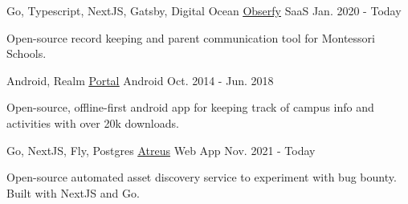 

\begin{cventries}

  \cventry
  {Go, Typescript, NextJS, Gatsby, Digital Ocean} %
  {\underline{\href{https://github.com/obserfy/obserfy}{Obserfy}}} %
  {SaaS} %
  {Jan. 2020 - Today} %
  {
    \begin{cvitems} %
      \item {Open-source record keeping and parent communication tool for Montessori Schools.}
    \end{cvitems}
  }

  \cventry
  {Android, Realm} %
  {\underline{\href{https://github.com/chrsep/Kingfish}{Portal}}} %
  {Android} %
  {Oct. 2014 - Jun. 2018} %
  {
    \begin{cvitems} %
      \item {Open-source, offline-first android app for keeping track of campus info and activities with over 20k downloads.}
    \end{cvitems}
  }


  \cventry
  {Go, NextJS, Fly, Postgres} %
  {\underline{\href{https://github.com/chrsep/atreus}{Atreus}}} %
  {Web App} %
  {Nov. 2021 - Today} %
  {
    \begin{cvitems} %
      \item {Open-source automated asset discovery service to experiment with bug bounty. Built with NextJS and Go. }
    \end{cvitems}
  }


\end{cventries}
